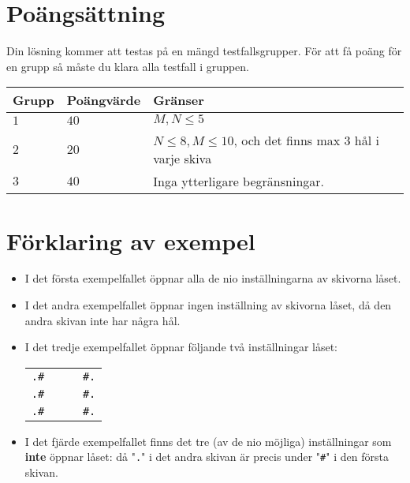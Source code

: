 \section*{Poängsättning}
Din lösning kommer att testas på en mängd testfallsgrupper.
För att få poäng för en grupp så måste du klara alla testfall i gruppen.

\noindent
\begin{tabular}{| l | l | l |}
  \hline
  Grupp & Poängvärde & Gränser \\ \hline
  $1$    & $40$        &  $M, N \le 5$ \\ \hline 
  $2$    & $20$        &  $N \le 8, M \le 10$, och det finns max 3 hål i varje skiva \\ \hline 
  $3$    & $40$        &  Inga ytterligare begränsningar. \\ \hline
\end{tabular}

\section*{Förklaring av exempel}

\begin{itemize}
  \item
I det första exempelfallet öppnar alla de nio inställningarna av skivorna låset.

  \item
I det andra exempelfallet öppnar ingen inställning av skivorna låset, då den andra skivan inte har några hål.

  \item
I det tredje exempelfallet öppnar följande två inställningar låset:

\begin{center}
  \begin{tabular}{c|c}
    {\raggedleft \texttt{.\#~~}}& {\raggedright \texttt{~~\#.}}\\
    {\raggedleft \texttt{.\#~~}}& {\raggedright \texttt{~~\#.}}\\
    {\raggedleft \texttt{.\#~~}}& {\raggedright \texttt{~~\#.}}
  \end{tabular}
\end{center}

  \item
    I det fjärde exempelfallet finns det tre (av de nio möjliga) inställningar som \textbf{inte} öppnar låset: då "\texttt{.}" i det andra skivan är precis under
    "\texttt{\#}" i den första skivan.

\end{itemize}
